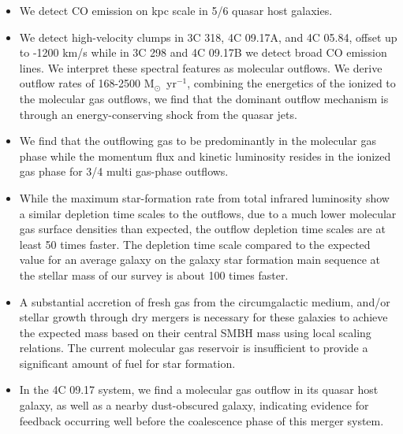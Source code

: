 \documentclass[twocolumn]{aastex63}
\newcommand{\myr}{M$_\odot$~yr$^{-1}$}
\begin{document}
\begin{itemize}
    \item We detect CO emission on kpc scale in 5/6 quasar host galaxies.
    \item We detect high-velocity clumps in 3C 318, 4C 09.17A, and 4C 05.84, offset up to -1200 km/s while in 3C 298 and 4C 09.17B we detect broad CO emission lines. We interpret these spectral features as molecular outflows. We derive outflow rates of 168-2500 \myr, combining the energetics of the ionized to the molecular gas outflows, we find that the dominant outflow mechanism is through an energy-conserving shock from the quasar jets.
    \item We find that the outflowing gas to be predominantly in the molecular gas phase while the momentum flux and kinetic luminosity resides in the ionized gas phase for 3/4 multi gas-phase outflows.
    \item While the maximum star-formation rate from total infrared luminosity show a similar depletion time scales to the outflows, due to a much lower molecular gas surface densities than expected, the outflow depletion time scales are at least 50 times faster. The depletion time scale compared to the expected value for an average galaxy on the galaxy star formation main sequence at the stellar mass of our survey is about 100 times faster.
    \item A substantial accretion of fresh gas from the circumgalactic medium, and/or stellar growth through dry mergers is necessary for these galaxies to achieve the expected mass based on their central SMBH mass using local scaling relations. The current molecular gas reservoir is insufficient to provide a significant amount of fuel for star formation.
    \item In the 4C 09.17 system, we find a molecular gas outflow in its quasar host galaxy, as well as a nearby dust-obscured galaxy, indicating evidence for feedback occurring well before the coalescence phase of this merger system.
\end{itemize}

{}

\end{document}
